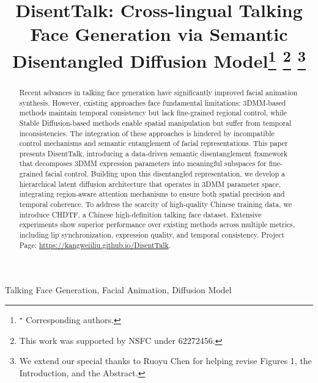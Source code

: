 \documentclass[conference]{IEEEtran}
\begin{document}
\title{DisentTalk: Cross-lingual Talking Face Generation via Semantic Disentangled Diffusion Model\thanks{$^{\star}$ Corresponding authors.}
\thanks{This work was supported by NSFC under 62272456.}
\thanks{We extend our special thanks to Ruoyu Chen for helping revise Figures 1, the Introduction, and the Abstract.}
}
\author{
}

\maketitle

\begin{abstract}
Recent advances in talking face generation have significantly improved facial animation synthesis. However, existing approaches face fundamental limitations: 3DMM-based methods maintain temporal consistency but lack fine-grained regional control, while Stable Diffusion-based methods enable spatial manipulation but suffer from temporal inconsistencies. The integration of these approaches is hindered by incompatible control mechanisms and semantic entanglement of facial representations. This paper presents DisentTalk, introducing a data-driven semantic disentanglement framework that decomposes 3DMM expression parameters into meaningful subspaces for fine-grained facial control. Building upon this disentangled representation, we develop a hierarchical latent diffusion architecture that operates in 3DMM parameter space, integrating region-aware attention mechanisms to ensure both spatial precision and temporal coherence. To address the scarcity of high-quality Chinese training data, we introduce CHDTF, a Chinese high-definition talking face dataset. Extensive experiments show superior performance over existing methods across multiple metrics, including lip synchronization, expression quality, and temporal consistency. Project Page: \url{https://kangweiiliu.github.io/DisentTalk}.
\end{abstract}

\begin{IEEEkeywords}
Talking Face Generation, Facial Animation, Diffusion Model
\end{IEEEkeywords}
\end{document}
